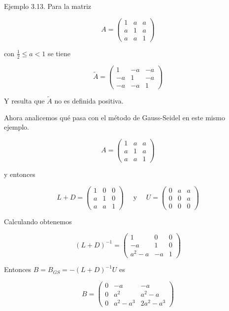 \documentclass[10pt]{article}
\begin{document}
Ejemplo 3.13. Para la matriz

$$
A=\left(\begin{array}{lll}
1 & a & a \\
a & 1 & a \\
a & a & 1
\end{array}\right)
$$

con $\frac{1}{2} \leq a<1$ se tiene

$$
\tilde{A}=\left(\begin{array}{ccc}
1 & -a & -a \\
-a & 1 & -a \\
-a & -a & 1
\end{array}\right)
$$

Y resulta que $\tilde{A}$ no es definida positiva.

Ahora analicemos qué pasa con el método de Gauss-Seidel en este mismo ejemplo.

$$
A=\left(\begin{array}{lll}
1 & a & a \\
a & 1 & a \\
a & a & 1
\end{array}\right)
$$

y entonces

$$
L+D=\left(\begin{array}{ccc}
1 & 0 & 0 \\
a & 1 & 0 \\
a & a & 1
\end{array}\right) \quad \text { y } \quad U=\left(\begin{array}{ccc}
0 & a & a \\
0 & 0 & a \\
0 & 0 & 0
\end{array}\right)
$$

Calculando obtenemos

$$
(L+D)^{-1}=\left(\begin{array}{ccc}
1 & 0 & 0 \\
-a & 1 & 0 \\
a^{2}-a & -a & 1
\end{array}\right)
$$

Entonces $B=B_{G S}=-(L+D)^{-1} U$ es

$$
B=\left(\begin{array}{ccc}
0 & -a & -a \\
0 & a^{2} & a^{2}-a \\
0 & a^{2}-a^{3} & 2 a^{2}-a^{3}
\end{array}\right)
$$
\end{document}
